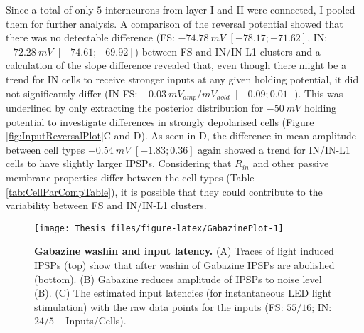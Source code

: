 \documentclass[
  12pt,
  a4paper,
  openany]{book}
\begin{document}
Since a total of only \(5\) interneurons from layer I and II were connected, I pooled them for further analysis. A comparison of the reversal potential showed that there was no detectable difference (FS: \(-74.78\ mV\) \([-78.17; -71.62]\), IN: \(-72.28\ mV\) \([-74.61; -69.92]\)) between FS and IN/IN-L1 clusters and a calculation of the slope difference revealed that, even though there might be a trend for IN cells to receive stronger inputs at any given holding potential, it did not significantly differ (IN-FS: \(-0.03\ mV_{amp}/mV_{hold}\) \([-0.09; 0.01]\)). This was underlined by only extracting the posterior distribution for \(-50\ mV\) holding potential to investigate differences in strongly depolarised cells (Figure \ref{fig:InputReversalPlot}C and D). As seen in D, the difference in mean amplitude between cell types \(-0.54\ mV\) \([-1.83; 0.36]\) again showed a trend for IN/IN-L1 cells to have slightly larger IPSPs. Considering that \(R_{in}\) and other passive membrane properties differ between the cell types (Table \ref{tab:CellParCompTable}), it is possible that they could contribute to the variability between FS and IN/IN-L1 clusters.




\begin{figure}[H]

{\centering \texttt{[image: Thesis\_files/figure-latex/GabazinePlot-1]} 

}

\caption[Gabazine washin and input latency]{\textbf{Gabazine washin and input latency.} (A) Traces of light induced IPSPs (top) show that after washin of Gabazine IPSPs are abolished (bottom). (B) Gabazine reduces amplitude of IPSPs to noise level (B). (C) The estimated input latencies (for instantaneous LED light stimulation) with the raw data points for the inputs (FS: \(55/16\); IN: \(24/5\) -- Inputs/Cells).}\label{fig:GabazinePlot}
\end{figure}
\end{document}
